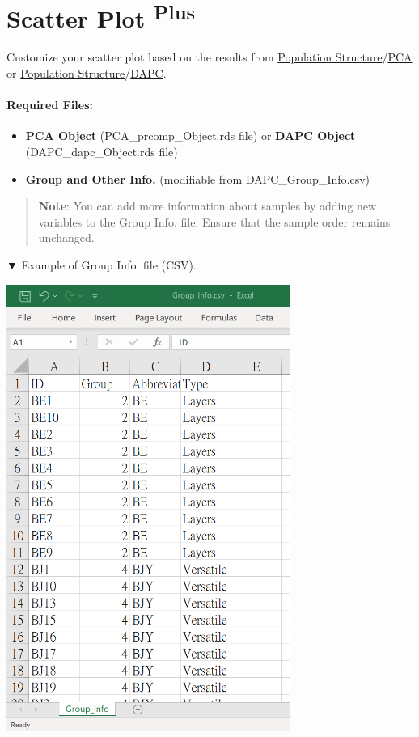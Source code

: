\documentclass[
]{book}
\providecommand{\tightlist}{%
  \setlength{\itemsep}{0pt}\setlength{\parskip}{0pt}}
\begin{document}
\section{\texorpdfstring{Scatter Plot \textsuperscript{Plus}}{Scatter Plot Plus}}\label{scatter-plot-plus}

Customize your scatter plot based on the results from \ul{Population Structure}/\ul{PCA} or \ul{Population Structure}/\ul{DAPC}.

\paragraph*{Required Files:}\label{required-files}

\begin{itemize}
\tightlist
\item
  \textbf{PCA Object} (PCA\_prcomp\_Object.rds file) or \textbf{DAPC Object} (DAPC\_dapc\_Object.rds file)
\item
  \textbf{Group and Other Info.} (modifiable from DAPC\_Group\_Info.csv)
\end{itemize}

\begin{quote}
\textbf{Note}: You can add more information about samples by adding new variables to the Group Info. file. Ensure that the sample order remains unchanged.
\end{quote}

▼ Example of Group Info. file (CSV).

\includegraphics[width=3.64583in,height=\textheight]{images/clipboard-4028088589.png}
\end{document}
